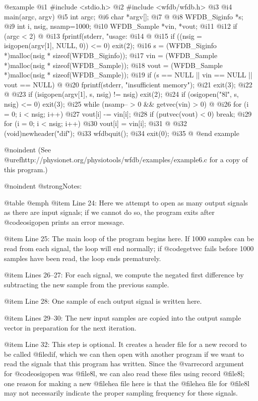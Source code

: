{{{{{{{{{{{{{{@example
 @i{1}  #include <stdio.h>
 @i{2}  #include <wfdb/wfdb.h>
 @i{3}
 @i{4}  main(argc, argv)
 @i{5}  int argc;
 @i{6}  char *argv[];
 @i{7}  @{
 @i{8}      WFDB_Siginfo *s;
 @i{9}      int i, nsig, nsamp=1000;
@i{10}      WFDB_Sample *vin, *vout;
@i{11}
@i{12}      if (argc < 2) @{
@i{13}          fprintf(stderr, "usage: %
@i{14}      @}
@i{15}      if ((nsig = isigopen(argv[1], NULL, 0)) <= 0) exit(2);
@i{16}      s = (WFDB_Siginfo *)malloc(nsig * sizeof(WFDB_Siginfo));
@i{17}      vin = (WFDB_Sample *)malloc(nsig * sizeof(WFDB_Sample));
@i{18}      vout = (WFDB_Sample *)malloc(nsig * sizeof(WFDB_Sample));
@i{19}      if (s == NULL || vin == NULL || vout == NULL) @{
@i{20}          fprintf(stderr, "insufficient memory\n");
@i{21}          exit(3);
@i{22}      @}
@i{23}      if (isigopen(argv[1], s, nsig) != nsig) exit(2);
@i{24}      if (osigopen("8l", s, nsig) <= 0) exit(3);
@i{25}      while (nsamp-- > 0 && getvec(vin) > 0) @{
@i{26}          for (i = 0; i < nsig; i++)
@i{27}              vout[i] -= vin[i];
@i{28}          if (putvec(vout) < 0) break;
@i{29}          for (i = 0; i < nsig; i++)
@i{30}              vout[i] = vin[i];
@i{31}      @}
@i{32}      (void)newheader("dif");
@i{33}      wfdbquit();
@i{34}      exit(0);
@i{35}  @}
@end example

@noindent
(See @uref{http://physionet.org/physiotools/wfdb/examples/example6.c}
for a copy of this program.)

@noindent
@strong{Notes:}

@table @emph
@item Line 24:
Here we attempt to open as many output signals as there are input
signals; if we cannot do so, the program exits after @code{osigopen}
prints an error message.

@item Line 25:
The main loop of the program begins here.  If 1000 samples can be read
from each signal, the loop will end normally; if @code{getvec} fails
before 1000 samples have been read, the loop ends prematurely.

@item Lines 26--27:
For each signal, we compute the negated first difference by subtracting
the new sample from the previous sample.

@item Line 28:
One sample of each output signal is written here.

@item Lines 29--30:
The new input samples are copied into the output sample vector in preparation
for the next iteration.

@item Line 32:
This step is optional.  It creates a header file for a new record
to be called @file{dif}, which we can then open with another program if
we want to read the signals that this program has written.  Since the
@var{record} argument for @code{osigopen} was @file{8l}, we can also
read these files using record @file{8l}; one reason for making a new
@file{hea} file here is that the @file{hea} file for @file{8l} may
not necessarily indicate the proper sampling frequency for these
signals.

}}}}}}}}}}}}}}
